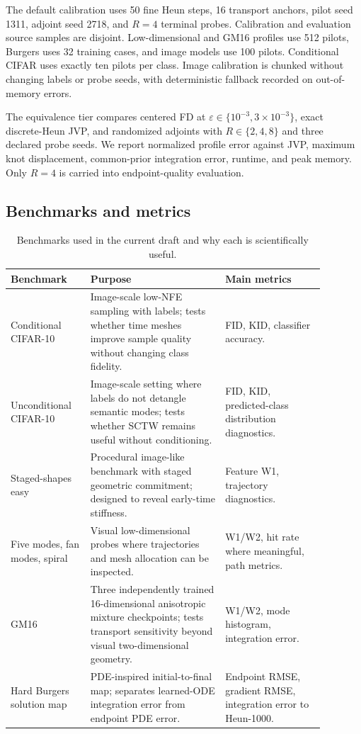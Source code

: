 The default calibration uses 50 fine Heun steps, 16 transport anchors, pilot seed 1311, adjoint
seed 2718, and $R=4$ terminal probes. Calibration and evaluation source samples are disjoint.
Low-dimensional and GM16 profiles use 512 pilots, Burgers uses 32 training cases, and image
models use 100 pilots. Conditional CIFAR uses exactly ten pilots per class. Image calibration is
chunked without changing labels or probe seeds, with deterministic fallback recorded on
out-of-memory errors.

The equivalence tier compares centered FD at $\varepsilon\in\{10^{-3},3\times10^{-3}\}$, exact
discrete-Heun JVP, and randomized adjoints with $R\in\{2,4,8\}$ and three declared probe seeds. We
report normalized profile error against JVP, maximum knot displacement, common-prior integration
error, runtime, and peak memory. Only $R=4$ is carried into endpoint-quality evaluation.

\subsection{Benchmarks and metrics}
\label{sec:benchmarks}

\begin{table}[t]
  \centering
  \caption{Benchmarks used in the current draft and why each is scientifically useful.}
  \label{tab:benchmarks}
  \begin{tabular}{p{0.22\linewidth}p{0.38\linewidth}p{0.28\linewidth}}
    \toprule
    Benchmark & Purpose & Main metrics \\
    \midrule
    Conditional CIFAR-10 & Image-scale low-NFE sampling with labels; tests whether time meshes
    improve sample quality without changing class fidelity. & FID, KID, classifier accuracy. \\
    Unconditional CIFAR-10 & Image-scale setting where labels do not detangle semantic modes;
    tests whether SCTW remains useful without conditioning. & FID, KID, predicted-class
    distribution diagnostics. \\
    Staged-shapes easy & Procedural image-like benchmark with staged geometric commitment;
    designed to reveal early-time stiffness. & Feature W1, trajectory diagnostics. \\
    Five modes, fan modes, spiral & Visual low-dimensional probes where trajectories and
    mesh allocation can be inspected. & W1/W2, hit rate where meaningful, path metrics. \\
    GM16 & Three independently trained 16-dimensional anisotropic mixture checkpoints; tests
    transport sensitivity beyond visual two-dimensional geometry. & W1/W2, mode histogram,
    integration error. \\
    Hard Burgers solution map & PDE-inspired initial-to-final map; separates learned-ODE
    integration error from endpoint PDE error. & Endpoint RMSE, gradient RMSE, integration
    error to Heun-1000. \\
    \bottomrule
  \end{tabular}
\end{table}

